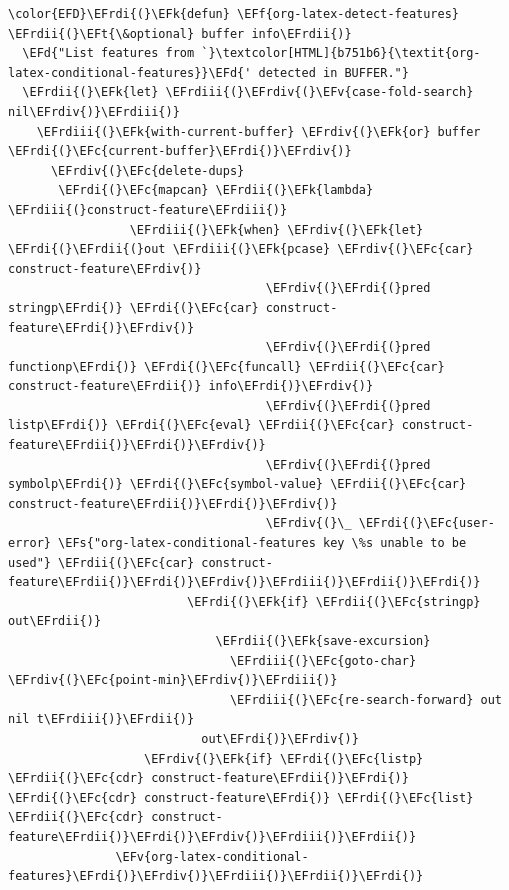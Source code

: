 \documentclass{scrartcl}
\newcommand{\EFk}[1]{\textcolor{EFk}{#1}} %
\newcommand{\EFd}[1]{\textcolor{EFd}{\textit{#1}}} %
\newcommand{\EFt}[1]{\textcolor{EFt}{#1}} %
\newcommand{\EFs}[1]{\textcolor{EFs}{#1}} %
\newcommand{\EFc}[1]{\textcolor{EFc}{#1}} %
\newcommand{\EFv}[1]{\textcolor{EFv}{#1}} %
\newcommand{\EFf}[1]{\textcolor{EFf}{#1}} %
\newcommand{\EFrdi}[1]{\textcolor{EFrdi}{#1}} %
\newcommand{\EFrdii}[1]{\textcolor{EFrdii}{#1}} %
\newcommand{\EFrdiii}[1]{\textcolor{EFrdiii}{#1}} %
\newcommand{\EFrdiv}[1]{\textcolor{EFrdiv}{#1}} %
\begin{document}
\begin{Code}
\begin{Verbatim}[]
\color{EFD}\EFrdi{(}\EFk{defun} \EFf{org-latex-detect-features} \EFrdii{(}\EFt{\&optional} buffer info\EFrdii{)}
  \EFd{"List features from `}\textcolor[HTML]{b751b6}{\textit{org-latex-conditional-features}}\EFd{' detected in BUFFER."}
  \EFrdii{(}\EFk{let} \EFrdiii{(}\EFrdiv{(}\EFv{case-fold-search} nil\EFrdiv{)}\EFrdiii{)}
    \EFrdiii{(}\EFk{with-current-buffer} \EFrdiv{(}\EFk{or} buffer \EFrdi{(}\EFc{current-buffer}\EFrdi{)}\EFrdiv{)}
      \EFrdiv{(}\EFc{delete-dups}
       \EFrdi{(}\EFc{mapcan} \EFrdii{(}\EFk{lambda} \EFrdiii{(}construct-feature\EFrdiii{)}
                 \EFrdiii{(}\EFk{when} \EFrdiv{(}\EFk{let} \EFrdi{(}\EFrdii{(}out \EFrdiii{(}\EFk{pcase} \EFrdiv{(}\EFc{car} construct-feature\EFrdiv{)}
                                    \EFrdiv{(}\EFrdi{(}pred stringp\EFrdi{)} \EFrdi{(}\EFc{car} construct-feature\EFrdi{)}\EFrdiv{)}
                                    \EFrdiv{(}\EFrdi{(}pred functionp\EFrdi{)} \EFrdi{(}\EFc{funcall} \EFrdii{(}\EFc{car} construct-feature\EFrdii{)} info\EFrdi{)}\EFrdiv{)}
                                    \EFrdiv{(}\EFrdi{(}pred listp\EFrdi{)} \EFrdi{(}\EFc{eval} \EFrdii{(}\EFc{car} construct-feature\EFrdii{)}\EFrdi{)}\EFrdiv{)}
                                    \EFrdiv{(}\EFrdi{(}pred symbolp\EFrdi{)} \EFrdi{(}\EFc{symbol-value} \EFrdii{(}\EFc{car} construct-feature\EFrdii{)}\EFrdi{)}\EFrdiv{)}
                                    \EFrdiv{(}\_ \EFrdi{(}\EFc{user-error} \EFs{"org-latex-conditional-features key \%s unable to be used"} \EFrdii{(}\EFc{car} construct-feature\EFrdii{)}\EFrdi{)}\EFrdiv{)}\EFrdiii{)}\EFrdii{)}\EFrdi{)}
                         \EFrdi{(}\EFk{if} \EFrdii{(}\EFc{stringp} out\EFrdii{)}
                             \EFrdii{(}\EFk{save-excursion}
                               \EFrdiii{(}\EFc{goto-char} \EFrdiv{(}\EFc{point-min}\EFrdiv{)}\EFrdiii{)}
                               \EFrdiii{(}\EFc{re-search-forward} out nil t\EFrdiii{)}\EFrdii{)}
                           out\EFrdi{)}\EFrdiv{)}
                   \EFrdiv{(}\EFk{if} \EFrdi{(}\EFc{listp} \EFrdii{(}\EFc{cdr} construct-feature\EFrdii{)}\EFrdi{)} \EFrdi{(}\EFc{cdr} construct-feature\EFrdi{)} \EFrdi{(}\EFc{list} \EFrdii{(}\EFc{cdr} construct-feature\EFrdii{)}\EFrdi{)}\EFrdiv{)}\EFrdiii{)}\EFrdii{)}
               \EFv{org-latex-conditional-features}\EFrdi{)}\EFrdiv{)}\EFrdiii{)}\EFrdii{)}\EFrdi{)}
\end{Verbatim}
\end{Code}
\end{document}
